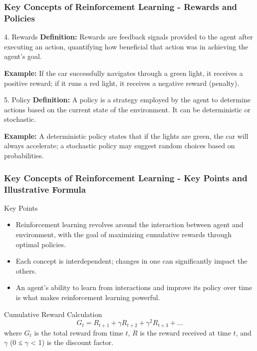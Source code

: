 \documentclass{beamer}
\begin{document}
\begin{frame}[fragile]
    \frametitle{Key Concepts of Reinforcement Learning - Rewards and Policies}
    \begin{block}{4. Rewards}
        \textbf{Definition:} Rewards are feedback signals provided to the agent after executing an action, quantifying how beneficial that action was in achieving the agent's goal.
    \end{block}
    \begin{example}
        \textbf{Example:} If the car successfully navigates through a green light, it receives a positive reward; if it runs a red light, it receives a negative reward (penalty).
    \end{example}
    
    \begin{block}{5. Policy}
        \textbf{Definition:} A policy is a strategy employed by the agent to determine actions based on the current state of the environment. It can be deterministic or stochastic.
    \end{block}
    \begin{example}
        \textbf{Example:} A deterministic policy states that if the lights are green, the car will always accelerate; a stochastic policy may suggest random choices based on probabilities.
    \end{example}
\end{frame}

\begin{frame}[fragile]
    \frametitle{Key Concepts of Reinforcement Learning - Key Points and Illustrative Formula}
    \begin{block}{Key Points}
        \begin{itemize}
            \item Reinforcement learning revolves around the interaction between agent and environment, with the goal of maximizing cumulative rewards through optimal policies.
            \item Each concept is interdependent; changes in one can significantly impact the others.
            \item An agent's ability to learn from interactions and improve its policy over time is what makes reinforcement learning powerful.
        \end{itemize}
    \end{block}
    
    \begin{block}{Cumulative Reward Calculation}
        \begin{equation}
        G_t = R_{t+1} + \gamma R_{t+2} + \gamma^2 R_{t+3} + \ldots
        \end{equation}
        where \( G_t \) is the total reward from time \( t \), \( R \) is the reward received at time \( t \), and \( \gamma \) (0 ≤ \(\gamma\) < 1) is the discount factor.
    \end{block}
\end{frame}
\end{document}
